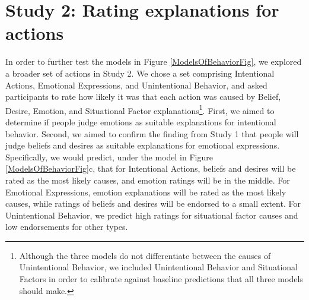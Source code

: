 \documentclass[10pt,letterpaper]{article}
\newcommand{\ndg}[1]{\textcolor{Green}{[ndg: #1]}}
\begin{document}
\section{Study 2: Rating explanations for actions}


In order to further test the models in Figure \ref{ModelsOfBehaviorFig}, we explored a broader set of actions in Study 2. 
We chose a set comprising Intentional Actions, Emotional Expressions, and Unintentional Behavior, and asked participants to rate how likely it was that each action was caused by Belief, Desire, Emotion, and Situational Factor explanations\footnote{Although the three models do not differentiate between the causes of Unintentional Behavior, we included Unintentional Behavior and Situational Factors in order to calibrate against baseline predictions that all three models should make.
}. First, we aimed to determine if people judge emotions as suitable explanations for intentional behavior. Second, we aimed to confirm the finding from Study 1 that people will judge beliefs and desires as suitable explanations for emotional expressions. 
Specifically, we would predict, under the model in Figure \ref{ModelsOfBehaviorFig}c, that for Intentional Actions, beliefs and desires will be rated as the most likely causes, and emotion ratings will be in the middle. For Emotional Expressions, emotion explanations will be rated as the most likely causes, while ratings of beliefs and desires will be endorsed to a small extent. For Unintentional Behavior, we predict high ratings for situational factor causes and low endorsements for other types.


\end{document}
